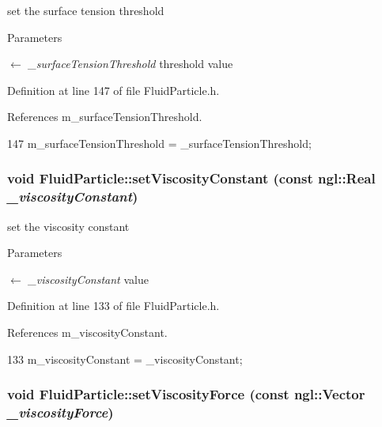 set the surface tension threshold 


\begin{DoxyParams}{Parameters}
\item[\mbox{$\leftarrow$} {\em \_\-surfaceTensionThreshold}]threshold value \end{DoxyParams}


Definition at line 147 of file FluidParticle.h.



References m\_\-surfaceTensionThreshold.




\begin{DoxyCode}
147 { m_surfaceTensionThreshold = _surfaceTensionThreshold; }
\end{DoxyCode}


\hypertarget{class_fluid_particle_aedde7e367011a2e11849442462085b6c}{
\subsubsection[{setViscosityConstant}]{\setlength{\rightskip}{0pt plus 5cm}void FluidParticle::setViscosityConstant (const ngl::Real {\em \_\-viscosityConstant})}}
\label{class_fluid_particle_aedde7e367011a2e11849442462085b6c}


set the viscosity constant 


\begin{DoxyParams}{Parameters}
\item[\mbox{$\leftarrow$} {\em \_\-viscosityConstant}]value \end{DoxyParams}


Definition at line 133 of file FluidParticle.h.



References m\_\-viscosityConstant.




\begin{DoxyCode}
133 { m_viscosityConstant = _viscosityConstant; }
\end{DoxyCode}


\hypertarget{class_fluid_particle_ac4e550043305501a7157dd1489ae4a1a}{
\subsubsection[{setViscosityForce}]{\setlength{\rightskip}{0pt plus 5cm}void FluidParticle::setViscosityForce (const ngl::Vector {\em \_\-viscosityForce})}}
\label{class_fluid_particle_ac4e550043305501a7157dd1489ae4a1a}


